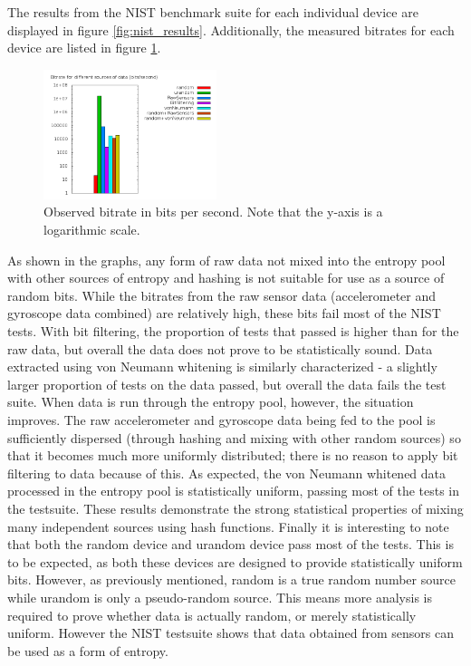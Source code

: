 
The results from the NIST benchmark suite for each individual device are
displayed in figure \ref{fig:nist_results}.  Additionally, the measured
bitrates for each device are listed in figure \ref{fig:bitrates}.

\begin{figure}[h]
	\centering
	\includegraphics[width=0.45\textwidth]{bitrate.png}
	\caption{Observed bitrate in bits per second.  Note that the y-axis is 
a logarithmic scale.}
	\label{fig:bitrates}
\end{figure}

As shown in the graphs, any form of raw data not mixed into the entropy pool
with other sources of entropy and hashing is not suitable for use as a source
of random bits.  While the bitrates from the raw sensor data (accelerometer
and gyroscope data combined) are relatively high, these bits fail most of the
NIST tests.  With bit filtering, the proportion of tests that passed is higher
than for the raw data, but overall the data does not prove to be statistically
sound.  Data extracted using von Neumann whitening is similarly characterized -
a slightly larger proportion of tests on the data passed, but overall the data
fails the test suite.  When data is run through the entropy pool, however, the
situation improves.  The raw accelerometer and gyroscope data being fed to the
pool is sufficiently dispersed (through hashing and mixing with other random
sources) so that it becomes much more uniformly distributed; there is no
reason to apply bit filtering to data because of this.  As expected, the
von Neumann whitened data processed in the entropy pool is statistically
uniform, passing most of the tests in the testsuite.  These results demonstrate
the strong statistical properties of mixing many independent sources using hash
functions.  Finally it is interesting to note that both the random device and
urandom device pass most of the tests.  This is to be expected, as both these
devices are designed to provide statistically uniform bits.  However, as
previously mentioned, random is a true random number source while urandom is
only a pseudo-random source.  This means more analysis is required to prove
whether data is actually random, or merely statistically uniform.  However the
NIST testsuite shows that data obtained from sensors can be used as a form of
entropy.

